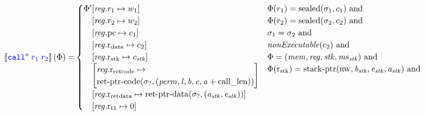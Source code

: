 \documentclass[a4paper]{article}
\begin{document}
\begin{align*}
  \sem{\scall{o}{\src{r_1}}{\src{r_2}}}(\Phi) = & 
                                               \begin{cases}
                                                 \Phi'
                                                 \arraycolsep=0pt
                                                 \begin{array}[t]{rl}
                                                   &\updReg{r_1}{w_1} \\
                                                        &\updReg{r_2}{w_2} \\
                                                        &\updReg{\pcreg}{c_1}\\
                                                        &\updReg{\rdata}{c_2}\\
                                                        &\updReg{\rstk}{c_\stk}\\
                                                        &\left[
\arraycolsep=0pt\array{l}
\reg.\rretc \mapsto \\
\hfill \retptrc(\sigma_?,(\perm,\lin,\baddr,\eaddr,\aaddr+\calllen))
\endarray
\right]\\
                                                        &\updReg{\rretd}{\retptrd(\sigma_?,(\aaddr_\stk,\eaddr_\stk))}\\
                                                        &\updReg{\rtmp{1}}{0}
                                                 \end{array}
                                                 & 
                                                 \arraycolsep=0pt
                                                 \begin{array}[t]{l}
                                                   \Phi(r_1) = \sealed{\sigma_1,c_1} \tand \\
                                                   \Phi(r_2) = \sealed{\sigma_2,c_2} \tand \\
                                                   \sigma_1 = \sigma_2 \tand \\
                                                   \nonExec{c_2} \tand\\
                                                   \Phi = (\mem,\reg,\stk,\ms_\stk) \tand\\
                                                   \Phi(\rstk) = \stkptr{\rw,\baddr_\stk,\eaddr_\stk,\aaddr_\stk} \tand \\

\end{array}
\end{cases}
\end{align*}
\end{document}
